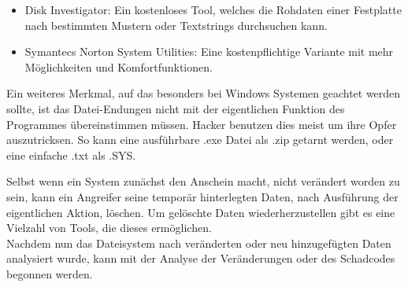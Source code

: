 \begin{itemize}
\item Disk Investigator: Ein kostenloses Tool, welches die Rohdaten einer Festplatte nach bestimmten Mustern oder Textstrings durchsuchen kann.
\item Symantecs Norton System Utilities: Eine kostenpflichtige Variante mit mehr Möglichkeiten und Komfortfunktionen.
\end{itemize} 

\noindent Ein weiteres Merkmal, auf das besonders bei Windows Systemen geachtet werden sollte, ist das Datei-Endungen nicht mit der eigentlichen Funktion des Programmes übereinstimmen müssen. Hacker benutzen dies meist um ihre Opfer auszutricksen. So kann eine ausführbare .exe Datei als .zip getarnt werden, oder eine einfache .txt als .SYS.

Selbst wenn ein System zunächst den Anschein macht, nicht verändert worden zu sein, kann ein Angreifer seine temporär hinterlegten Daten, nach Ausführung der eigentlichen Aktion, löschen. Um gelöschte Daten wiederherzustellen gibt es eine Vielzahl von Tools, die dieses ermöglichen.  \\

\noindent Nachdem nun das Dateisystem nach veränderten oder neu hinzugefügten Daten analysiert wurde, kann mit der Analyse der Veränderungen oder des Schadcodes begonnen werden. 
